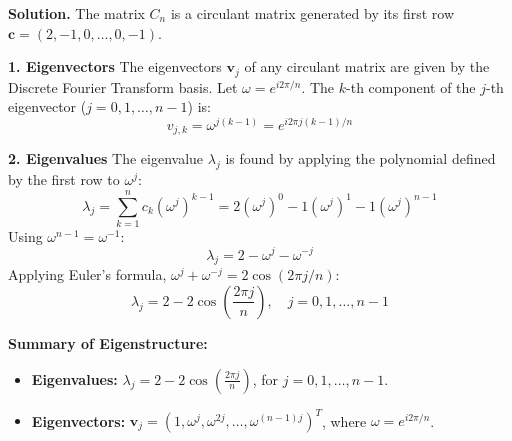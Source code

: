 \documentclass[12pt,a4paper,oneside]{article}
\newenvironment{solution}
  {\par\noindent\textbf{Solution. }\newline}
  {\par}
\begin{document}
\begin{solution}
The matrix $C_n$ is a circulant matrix generated by its first row $\mathbf{c} = (2, -1, 0, \ldots, 0, -1)$.

\textbf{1. Eigenvectors}
The eigenvectors $\mathbf{v}_j$ of any circulant matrix are given by the Discrete Fourier Transform basis. Let $\omega = e^{i 2 \pi / n}$. The $k$-th component of the $j$-th eigenvector ($j=0, 1, \ldots, n-1$) is:
$$v_{j, k} = \omega^{j(k-1)} = e^{i 2 \pi j (k-1) / n}$$

\textbf{2. Eigenvalues}
The eigenvalue $\lambda_j$ is found by applying the polynomial defined by the first row to $\omega^j$:
$$\lambda_j = \sum_{k=1}^n c_k (\omega^j)^{k-1} = 2(\omega^j)^0 - 1(\omega^j)^1 - 1(\omega^j)^{n-1}$$Using $\omega^{n-1} = \omega^{-1}$:$$\lambda_j = 2 - \omega^j - \omega^{-j}$$Applying Euler's formula, $\omega^j + \omega^{-j} = 2 \cos(2 \pi j / n)$:$$\lambda_j = 2 - 2 \cos\left(\frac{2 \pi j}{n}\right), \quad j=0, 1, \ldots, n-1$$

\textbf{Summary of Eigenstructure:}
\begin{itemize}
    \item \textbf{Eigenvalues:} $\lambda_j = 2 - 2 \cos\left(\frac{2 \pi j}{n}\right)$, for $j=0, 1, \ldots, n-1$.
    \item \textbf{Eigenvectors:} $\mathbf{v}_j = \left( 1, \omega^j, \omega^{2j}, \ldots, \omega^{(n-1)j} \right)^T$, where $\omega = e^{i 2 \pi / n}$.
\end{itemize}
\end{solution}
\end{document}
